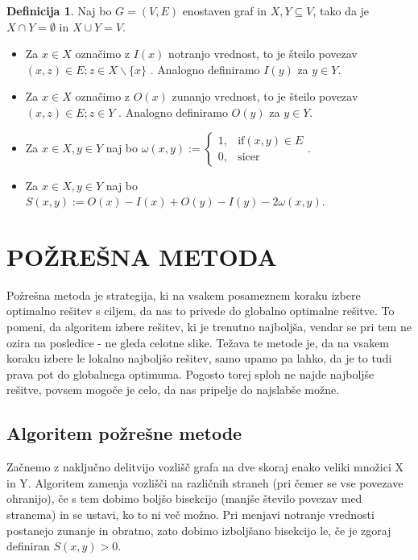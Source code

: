 \documentclass[12pt,a4paper]{amsart}
\theoremstyle{definition} %
\newtheorem{definicija}{Definicija}[section]
\theoremstyle{plain} %
\begin{document}
\begin{definicija}
Naj bo $G=(V,E)$ enostaven graf in $X,Y \subseteq V$, tako da je $X \cap Y = \emptyset$ in $X \cup Y =V$.
\begin{itemize}
\item Za $x \in X$ označimo z $I(x)$ notranjo vrednost, to je šteilo povezav $(x,z) \in E;z\in X \backslash \{x\}$ . Analogno definiramo $I(y)$ za $y \in Y$.
\item Za $x \in X$ označimo z $O(x)$ zunanjo vrednost, to je šteilo povezav $(x,z) \in E;z\in Y $ . Analogno definiramo $O(y)$ za $y \in Y$.
\item Za $x \in X, y \in Y$ naj bo $\omega(x,y) := \begin{cases} 1,&\text{if} (x,y) \in E\\ 
0, &\text{sicer}\end{cases} $.
\item Za $x \in X, y \in Y$ naj bo $S(x,y):= O(x)-I(x)+O(y)-I(y)-2\omega(x,y)$.
\end{itemize}
\end{definicija}
\bigbreak

\section{\textbf{POŽREŠNA METODA}}
Požrešna metoda je strategija, ki na vsakem posameznem koraku izbere optimalno rešitev s ciljem, da nas to privede do globalno optimalne rešitve. To pomeni, da algoritem izbere rešitev, ki je trenutno najboljša, vendar se pri tem ne ozira na posledice - ne gleda celotne slike. Težava te metode je, da na vsakem koraku izbere le lokalno najboljšo rešitev, samo upamo pa lahko, da je to tudi prava pot do globalnega optimuma. Pogosto torej sploh ne najde najboljše rešitve, povsem mogoče je celo, da nas pripelje do najslabše možne. \\

\subsection{Algoritem požrešne metode}
Začnemo z naključno delitvijo vozlišč grafa na dve skoraj enako veliki množici X in Y. Algoritem zamenja vozlišči na različnih straneh (pri čemer se vse povezave ohranijo), če s tem dobimo boljšo bisekcijo (manjše število povezav med stranema) in se ustavi, ko to ni več možno. Pri menjavi notranje vrednosti postanejo zunanje in obratno, zato dobimo izboljšano bisekcijo le, če je zgoraj definiran $S(x,y)>0$. \\
\end{document}
